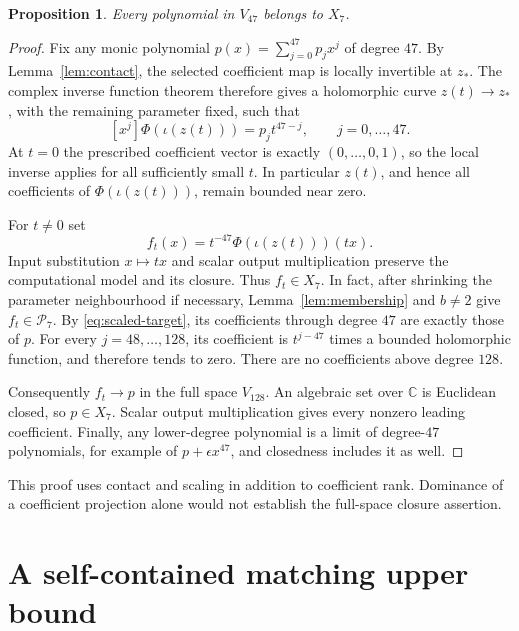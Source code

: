 \documentclass[11pt]{article}
\newtheorem{proposition}[theorem]{Proposition}
\newcommand{\C}{\mathbb C}
\newcommand{\coeff}[1]{[x^{#1}]}
\begin{document}
\begin{proposition}\label{prop:lower}
Every polynomial in $V_{47}$ belongs to $X_7$.
\end{proposition}

\begin{proof}
Fix any monic polynomial $p(x)=\sum_{j=0}^{47}p_jx^j$ of degree $47$.
By Lemma~\ref{lem:contact}, the selected coefficient map is locally
invertible at $z_*$. The complex inverse function theorem therefore
gives a holomorphic curve $z(t)\to z_*$, with the remaining parameter
fixed, such that
\begin{equation}\label{eq:scaled-target}
 \coeff j\Phi(\iota(z(t)))=p_jt^{47-j},\qquad j=0,\ldots,47.
\end{equation}
At $t=0$ the prescribed coefficient vector is exactly
$(0,\ldots,0,1)$, so the local inverse applies for all sufficiently
small $t$. In particular $z(t)$, and hence all coefficients of
$\Phi(\iota(z(t)))$, remain bounded near zero.

For $t\ne0$ set
\begin{equation}\label{eq:full-limit}
 f_t(x)=t^{-47}\Phi(\iota(z(t)))(tx).
\end{equation}
Input substitution $x\mapsto tx$ and scalar output multiplication
preserve the computational model and its closure. Thus $f_t\in X_7$.
In fact, after shrinking the parameter neighbourhood if necessary,
Lemma~\ref{lem:membership} and $b\ne2$ give $f_t\in\mathcal P_7$.
By \eqref{eq:scaled-target}, its coefficients through degree $47$
are exactly those of $p$. For every $j=48,\ldots,128$, its coefficient
is $t^{j-47}$ times a bounded holomorphic function, and therefore tends
to zero. There are no coefficients above degree $128$.

Consequently $f_t\to p$ in the full space $V_{128}$. An algebraic set
over $\C$ is Euclidean closed, so $p\in X_7$. Scalar output multiplication
gives every nonzero leading coefficient. Finally, any lower-degree
polynomial is a limit of degree-$47$ polynomials, for example of
$p+\epsilon x^{47}$, and closedness includes it as well.
\end{proof}

This proof uses contact and scaling in addition to coefficient rank.
Dominance of a coefficient projection alone would not establish the
full-space closure assertion.

\section{A self-contained matching upper bound}\label{sec:upper}
\end{document}
